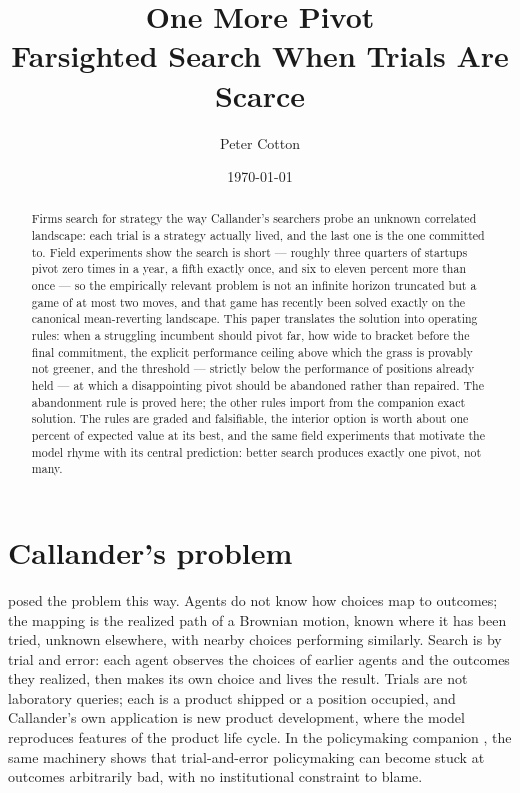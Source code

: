 \documentclass[11pt]{article}
\title{\textbf{One More Pivot}\\[0.4em]
\large Farsighted Search When Trials Are Scarce}
\author{Peter Cotton}
\date{\today}
\theoremstyle{itheads}
\begin{document}
\maketitle

\begin{abstract}
\noindent Firms search for strategy the way Callander's searchers probe
an unknown correlated landscape: each trial is a strategy actually
lived, and the last one is the one committed to. Field experiments show
the search is short --- roughly three quarters of startups pivot zero
times in a year, a fifth exactly once, and six to eleven percent more
than once --- so the empirically relevant problem is not an infinite
horizon truncated but a game of at most two moves, and that game has
recently been solved exactly on the canonical mean-reverting landscape.
This paper translates the solution into operating rules: when a
struggling incumbent should pivot far, how wide to bracket before the
final commitment, the explicit performance ceiling above which the
grass is provably not greener, and the threshold --- strictly below the
performance of positions already held --- at which a disappointing
pivot should be abandoned rather than repaired. The abandonment rule is proved here; the other rules import
from the companion exact solution. The rules are graded
and falsifiable, the interior option is worth about one percent of
expected value at its best, and the same field experiments that
motivate the model rhyme with its central prediction: better search
produces exactly one pivot, not many.
\end{abstract}

\section{Callander's problem}

\citet{callander2011b} posed the problem this way. Agents do not know
how choices map to outcomes; the mapping is the realized path of a
Brownian motion, known where it has been tried, unknown elsewhere, with
nearby choices performing similarly. Search is by trial and error:
each agent observes the choices of earlier agents and the outcomes
they realized, then makes its own choice and lives the result. Trials
are not laboratory queries; each is a product shipped or a position
occupied, and Callander's own application is new product development,
where the model reproduces features of the product life cycle. In the
policymaking companion \citep{callander2011}, the same machinery shows
that trial-and-error policymaking can become stuck at outcomes
arbitrarily bad, with no institutional constraint to blame.
\end{document}
